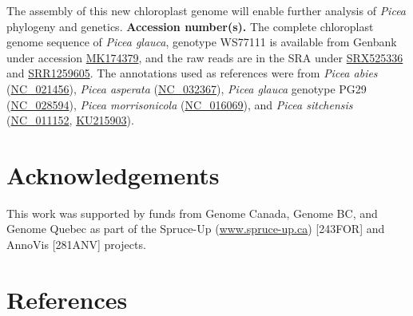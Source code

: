 \documentclass[titlepage,11pt, oneside]{article}   	%
\begin{document}
The assembly of this new chloroplast genome will enable further analysis of \textit{Picea} phylogeny and genetics.
\newline
\newline
\textbf{Accession number(s).} The complete chloroplast genome sequence of \textit{Picea glauca}, genotype WS77111 is available from Genbank under accession \href{https://www.ncbi.nlm.nih.gov/nuccore/MK174379}{MK174379}, and the raw reads are in the SRA under \href{https://www.ncbi.nlm.nih.gov/sra/SRX525336}{SRX525336} and \href{https://trace.ncbi.nlm.nih.gov/Traces/sra/?run=SRR1259605}{SRR1259605}. The annotations used as references were from \textit{Picea abies} (\href{https://www.ncbi.nlm.nih.gov/nuccore/NC_021456}{NC\_021456}), \textit{Picea asperata} (\href{https://www.ncbi.nlm.nih.gov/nuccore/NC_032367}{NC\_032367}), \textit{Picea glauca} genotype PG29 (\href{https://www.ncbi.nlm.nih.gov/nuccore/NC_028594}{NC\_028594}), \textit{Picea morrisonicola} (\href{https://www.ncbi.nlm.nih.gov/nuccore/NC_016069}{NC\_016069}), and \textit{Picea sitchensis} (\href{https://www.ncbi.nlm.nih.gov/nuccore/NC_011152}{NC\_011152}, \href{https://www.ncbi.nlm.nih.gov/nuccore/KU215903}{KU215903}).

\section*{Acknowledgements}
This work was supported by funds from Genome Canada, Genome BC, and Genome Quebec as part of the Spruce-Up (\url{www.spruce-up.ca}) [243FOR] and AnnoVis [281ANV] projects.

\section*{References}
\end{document}
